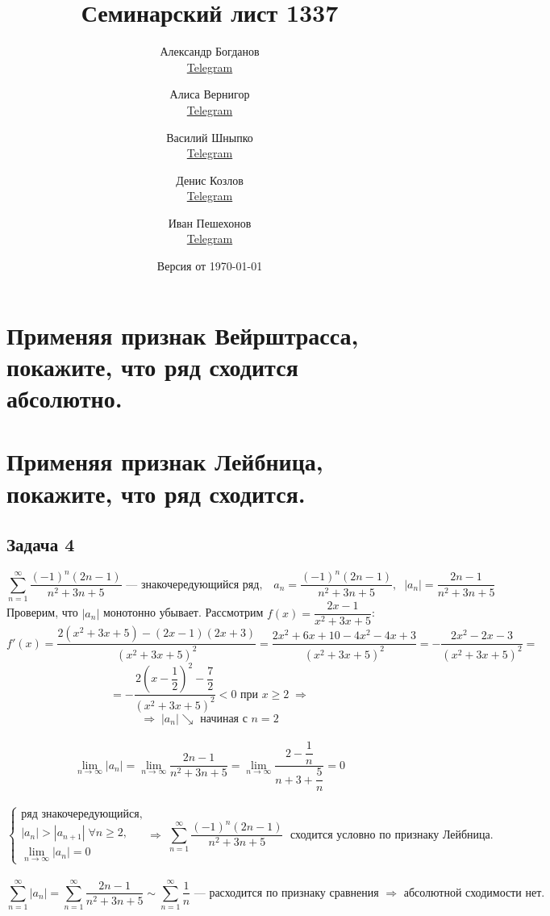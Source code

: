 \documentclass[a4paper,fleqn]{article}
\title{Семинарский лист 1337}
\author{
    Александр Богданов \\ \href{https://t.me/SphericalPotatoInVacuum}{Telegram} \and
    Алиса Вернигор     \\ \href{https://t.me/allisyonok}{Telegram} \and
    Василий Шныпко     \\ \href{https://t.me/yourvash}{Telegram} \and
    Денис Козлов       \\ \href{https://t.me/DKozl50}{Telegram} \and
    Иван Пешехонов     \\ \href{https://t.me/JohanDDC}{Telegram}
}
\date{Версия от {\ddmmyyyydate\today} \currenttime}
\begin{document}
    \maketitle
    \section*{Применяя признак Вейрштрасса, покажите, что ряд сходится абсолютно.}


    
    \section*{Применяя признак Лейбница, покажите, что ряд сходится.}
    \subsection*{Задача 4}
    \[ \sum_{n=1}^{\infty} \dfrac{(-1)^n (2n-1)}{n^2 + 3n + 5} \text{ --- знакочередующийся ряд}, \;\;\;
		 a_n = \dfrac{(-1)^n (2n-1)}{n^2 + 3n + 5}, \;\; |a_n|  = \dfrac{2n-1}{n^2 + 3n + 5} \]
		Проверим, что $|a_n|$ монотонно убывает. Рассмотрим $f(x) = \dfrac{2x-1}{x^2 + 3x + 5}$:
		\[ f'(x) = \dfrac{2(x^2 + 3x + 5) - (2x-1)(2x+3)}{(x^2 + 3x + 5)^2} = 
		\dfrac{2x^2 + 6x + 10 - 4x^2 - 4x + 3}{(x^2 + 3x + 5)^2} = 
		-\dfrac{2x^2 - 2x - 3}{(x^2 + 3x + 5)^2} = \]
		\[ = -\dfrac{2\left(x - \dfrac12\right)^2 - \dfrac72}{(x^2 + 3x + 5)^2} < 0 \text{ при } x \ge 2  \;\Rightarrow \]
		\[ \Rightarrow \; |a_n| \searrow \text{ начиная с } n = 2 \]\\[-20 pt]
		\[ \lim_{n\to\infty} |a_n| = \lim_{n\to\infty} \dfrac{2n-1}{n^2 + 3n + 5} = \lim_{n\to\infty}\dfrac{2-\dfrac1n}{n + 3 + \dfrac5n} = 0 \]\\[-10 pt]
		\[ \left\{\begin{array}{l} 
		\text{ряд знакочередующийся},\\[5 pt]
		|a_n| > |a_{n+1}| \; \forall n \ge 2,\\[5 pt]
		\lim_{n\to\infty} |a_n| = 0
		\end{array}\right.
		\Rightarrow \; \sum_{n=1}^{\infty} \dfrac{(-1)^n (2n-1)}{n^2 + 3n + 5} \; \text{ сходится условно по признаку Лейбница.} \]\\[-5 pt]
		\[ \sum_{n=1}^{\infty} |a_n| = \sum_{n=1}^{\infty} \dfrac{2n-1}{n^2 + 3n + 5} \sim \sum_{n=1}^{\infty} \dfrac{1}{n} \text{ --- расходится по признаку сравнения } \Rightarrow \text{ абсолютной сходимости нет.} \]\\
\end{document}
